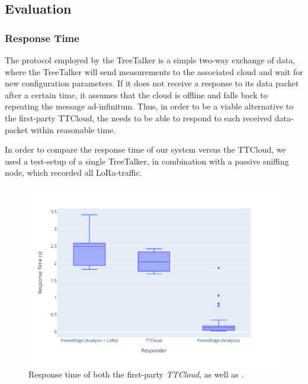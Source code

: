 \subsection{Evaluation}
\label{sec:TreeTalker:evaluation}

\subsubsection{Response Time}
\label{sec:evaluation:response-time}

The protocol employed by the TreeTalker is a simple two-way exchange of data, where the TreeTalker will send measurements to the associated cloud and wait for new configuration parameters.
If it does not receive a response to its data packet after a certain time, it assumes that the cloud is offline and falls back to repeating the message ad-infinitum.
Thus, in order to be a viable alternative to the first-party TTCloud, the \ttt needs to be able to respond to each received data-packet within reasonable time.

In order to compare the response time of our system versus the TTCloud, we used a test-setup of a single TreeTalker, in combination with a passive sniffing node, which recorded all LoRa-traffic.

\begin{figure}
    \centering
    \includegraphics[width=\linewidth]{figures/response_times.pdf}
    \caption{Response time of both the first-party \textit{TTCloud}, as well as \textit{\ttt}.}
    \label{fig:evaluation:ttt_response}
\end{figure}

